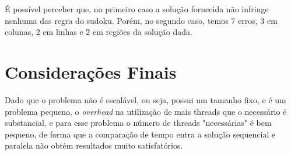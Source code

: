 \documentclass[a4paper, 12pt]{article}
\begin{document}
É possível perceber que, no primeiro caso a solução fornecida não infringe
nenhuma das regra do sudoku. Porém, no segundo caso, temos 7 erros, 3 em
colunas, 2 em linhas e 2 em regiões da solução dada.

\section{Considerações Finais}
Dado que o problema não é escalável, ou seja, possui um tamanho fixo, e é um
problema pequeno, o \textit{overhead} na utilização de mais threads que o
necessário é substancial, e para esse problema o número de threads "necessárias"
é bem pequeno,  de forma que a comparação de tempo entra a solução sequencial e
paralela não obtém resultados muito satisfatórios.
\end{document}
